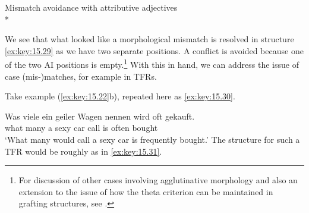 \documentclass[output=paper]{langsci/langscibook}
\begin{document}
\begin{refcontext}
\ea\label{ex:key:15.29} Mismatch avoidance with attributive adjectives\\*
\z


We see that what looked like a morphological mismatch is resolved in structure
\eqref{ex:key:15.29} as we have two separate positions.  A conflict is avoided because one of
the two AI positions is empty.\footnote{For discussion of other cases involving
agglutinative morphology and also an extension to the issue of how the theta
criterion can be maintained in grafting structures, see \citet{VanRiemsdijk2010}.} With this in hand, we can address the issue of case
(mis-)matches, for example in \glspl{TFR}.

Take example (\ref{ex:key:15.22}b), repeated here as
\eqref{ex:key:15.30}.\newpage

\ea{}
    \gll   \llap{*}Was viele ein\tss{\Nom{}} geiler\tss{\Nom{}} Wagen nennen\textsuperscript{\Acc{}} wird oft gekauft\textsuperscript{\Nom{}}.\\
            what many a          sexy          car       call            is      often bought\\
    \glt    ‘What many would call a sexy car is frequently bought.’\label{ex:key:15.30}
\z
The structure for such a \gls{TFR} would be roughly as in \eqref{ex:key:15.31}.


\end{refcontext}
\end{document}
